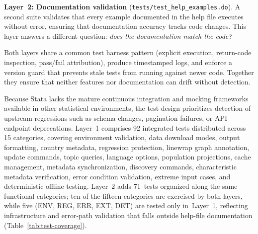 \documentclass[bib]{statapress}
\begin{document}
\textbf{Layer~2: Documentation validation}
(\texttt{tests/test\_help\_examples.do}).  A second suite validates that
every example documented in the help file executes without error, ensuring
that documentation accuracy tracks code changes.  This layer answers a
different question: \emph{does the documentation match the code?}

Both layers share a common test harness pattern (explicit execution,
return-code inspection, pass/fail attribution), produce timestamped logs,
and enforce a version guard that prevents stale tests from running against
newer code.  Together they ensure that neither features nor documentation
can drift without detection.

Because Stata lacks the mature continuous integration and mocking frameworks
available in other statistical environments, the test design prioritizes
detection of upstream regressions such as schema changes, pagination failures,
or API endpoint deprecations. Layer~1 comprises 92 integrated tests
distributed across 15 categories, covering environment validation, data download
modes, output formatting, country metadata, regression protection, linewrap
graph annotation, update commands, topic queries, language options, population
projections, cache management, metadata synchronization, discovery commands,
characteristic metadata verification, error condition validation, extreme input
cases, and deterministic offline testing.
Layer~2 adds 71~tests organized along the same functional categories;
ten of the fifteen categories are exercised by both layers, while five
(ENV, REG, ERR, EXT, DET) are tested only in~Layer~1, reflecting
infrastructure and error-path validation that falls outside help-file
documentation (Table~\ref{tab:test-coverage}).
\end{document}
